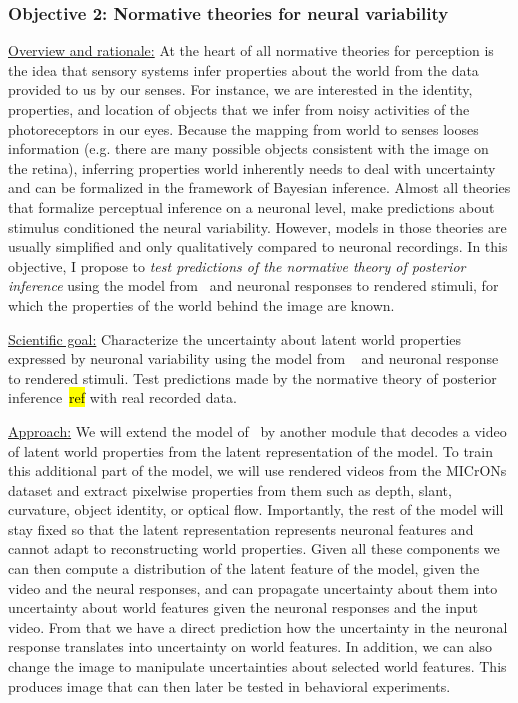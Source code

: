\documentclass[COG,11pt]{ercgrant}
\begin{document}
\subsubsection{\colorbox{objii}{\color{white}Objective 2}: Normative theories for neural variability}
\label{sub:objii}
\underline{Overview and rationale:} At the heart of all normative theories for perception is the idea that sensory systems infer properties about the world from the data provided to us by our senses. For instance, we are interested in the identity, properties, and location of objects that we infer from noisy activities of the photoreceptors in our eyes. Because the mapping from world to senses looses information (e.g. there are many possible objects consistent with the image on the retina), inferring properties world inherently needs to deal with uncertainty and can be formalized in the framework of Bayesian inference. Almost all theories that formalize perceptual inference on a neuronal level, make predictions about stimulus conditioned the neural variability. However, models in those theories are usually simplified and only qualitatively compared to neuronal recordings. In this objective, I propose to \textit{test predictions of the normative theory of posterior inference} using the model from \obji~and neuronal responses to rendered stimuli, for which the properties of the world behind the image are known. 

\underline{Scientific goal:} Characterize the uncertainty about latent world properties expressed by neuronal variability using the model from \obji~ and neuronal response to rendered stimuli. Test predictions made by the normative theory of posterior inference~\hl{ref} with real recorded data. 


\underline{Approach:}
We will extend the model of \obji~by another module that decodes a video of latent world properties from the latent representation of the model. To train this additional part of the model, we will use rendered videos from the MICrONs dataset and extract pixelwise properties from them such as depth, slant, curvature, object identity, or optical flow. Importantly, the rest of the model will stay fixed so that the latent representation represents neuronal features and cannot adapt to reconstructing world properties. Given all these components we can then compute a distribution of the latent feature of the model, given the video and the neural responses, and can propagate uncertainty about them into uncertainty about world features given the neuronal responses and the input video. From that we have a direct prediction how the uncertainty in the neuronal response translates into uncertainty on world features. In addition, we can also change the image to manipulate uncertainties about selected world features. This produces image that can then later be tested in behavioral experiments. 
\end{document}
